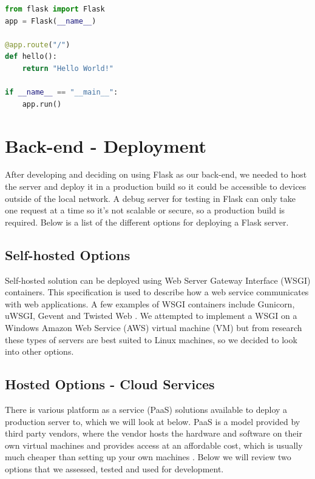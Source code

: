 \begin{lstlisting}[caption={Flask example.},label={lst:flask}, language=PYTHON]
from flask import Flask
app = Flask(__name__)

@app.route("/")
def hello():
    return "Hello World!"

if __name__ == "__main__":
    app.run()

\end{lstlisting}

\section{Back-end - Deployment}
After developing and deciding on using Flask as our back-end, we needed to host the server and deploy it in a production build so it could be accessible to devices outside of the local network. A debug server for testing in Flask can only take one request at a time so it's not scalable or secure, so a production build is required. Below is a list of the different options for deploying a Flask server.

\subsection{Self-hosted Options}
Self-hosted solution can be deployed using Web Server Gateway Interface (WSGI) containers. This specification is used to describe how a web service communicates with web applications. A few examples of WSGI containers include Gunicorn, uWSGI, Gevent and Twisted Web \cite{wsgi}. We attempted to implement a WSGI on a Windows Amazon Web Service (AWS) virtual machine (VM) but from research these types of servers are best suited to Linux machines, so we decided to look into other options.

\subsection{Hosted Options - Cloud Services}
There is various platform as a service (PaaS) solutions available to deploy a production server to, which we will look at below. PaaS is a model provided by third party vendors, where the vendor hosts the hardware and software on their own virtual machines and provides access at an affordable cost, which is usually much cheaper than setting up your own machines \cite{heroku}. Below we will review two options that we assessed, tested and used for development.


